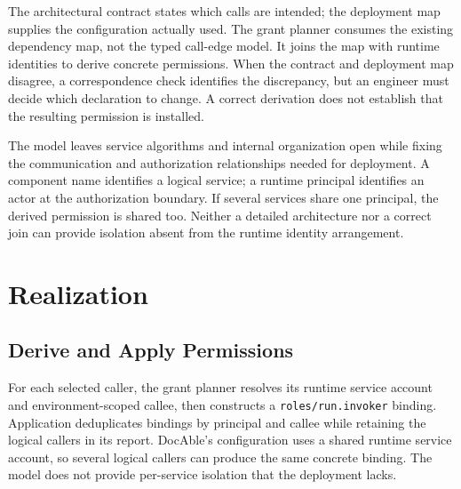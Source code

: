 The architectural contract states which calls are intended; the deployment map supplies the configuration actually used. The grant planner consumes the existing dependency map, not the typed call-edge model. It joins the map with runtime identities to derive concrete permissions. When the contract and deployment map disagree, a correspondence check identifies the discrepancy, but an engineer must decide which declaration to change. A correct derivation does not establish that the resulting permission is installed.

The model leaves service algorithms and internal organization open while fixing the communication and authorization relationships needed for deployment. A component name identifies a logical service; a runtime principal identifies an actor at the authorization boundary. If several services share one principal, the derived permission is shared too. Neither a detailed architecture nor a correct join can provide isolation absent from the runtime identity arrangement.

\section{Realization}

\subsection*{Derive and Apply Permissions}

For each selected caller, the grant planner resolves its runtime service account and environment-scoped callee, then constructs a \texttt{roles/run.invoker} binding. Application deduplicates bindings by principal and callee while retaining the logical callers in its report. DocAble's configuration uses a shared runtime service account, so several logical callers can produce the same concrete binding. The model does not provide per-service isolation that the deployment lacks.

